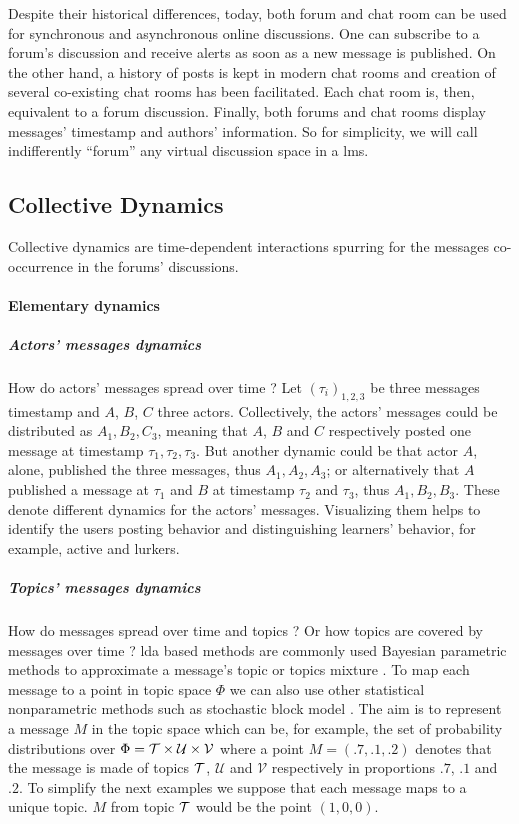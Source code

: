 \documentclass[a4paper,twoside]{article}
\newcommand{\V}{\mathcal{V}}
\newcommand{\U}{\mathcal{U}}
\begin{document}
Despite their historical differences, today, both forum and chat room can be used for synchronous and asynchronous online discussions.  One can subscribe to a forum's discussion and receive alerts as soon as a new message is published.  On the other hand, a history of posts is kept in modern chat rooms and creation of several co-existing chat rooms has been facilitated.  Each chat room is, then, equivalent to a forum discussion.  Finally, both forums and chat rooms display messages' timestamp and authors' information.
So for simplicity, we will call indifferently ``forum'' any virtual discussion space in a \gls{lms}.

\subsection{Collective Dynamics}

Collective dynamics are time-dependent interactions spurring for the messages co-occurrence in the forums' discussions.

\paragraph{Elementary dynamics}

\subparagraph{Actors' messages dynamics}
How do actors' messages spread over time ? Let $(\tau_i)_{1, 2, 3}$ be three messages timestamp and $A$, $B$, $C$ three actors.  Collectively, the actors' messages could be distributed as $A_1, B_2,C_3$, meaning that $A$, $B$ and $C$ respectively posted one message at timestamp $\tau_1, \tau_2, \tau_3$.  But another dynamic could be that actor $A$, alone, published the three messages, thus $A_1, A_2, A_3$; or alternatively that $A$ published a message at $\tau_1$ and $B$ at timestamp $\tau_2$ and $\tau_3$, thus $A_1, B_2, B_3$.  These denote different dynamics for the actors' messages.  Visualizing them helps to identify the users posting behavior and distinguishing learners' behavior, for example, active and lurkers.


\subparagraph{Topics' messages dynamics}
How do messages spread over time and topics ? Or how topics are covered by messages over time ?
\gls{lda} based methods are commonly used Bayesian parametric methods to approximate a message's topic or topics mixture \citep{Jelodar2017}.  To map each message to a point in topic space $\Phi$ we can also use other statistical nonparametric methods such as stochastic block model \citep{Gerlach2018}.   The aim is to represent a message $M$ in the topic space which can be, for example, the set of probability distributions over $\Phi = \T\times \U \times \V$ where a point $M = (.7, .1, .2)$ denotes that the message is made of topics $\mathcal{T}$, $\U$ and $\V$ respectively in proportions $.7$, $.1$ and $.2$.  To simplify the next examples we suppose that each message maps to a unique topic.  $M$ from topic $\mathcal{T}$ would be the point $(1, 0, 0)$.
\end{document}
